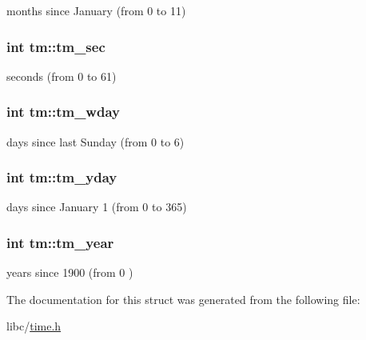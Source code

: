 months since January (from 0 to 11) \hypertarget{structtm_a4d098a9a5c03a00b2ee61e10851de81e}{
\subsubsection[{tm\_\-sec}]{\setlength{\rightskip}{0pt plus 5cm}int {\bf tm::tm\_\-sec}}}
\label{structtm_a4d098a9a5c03a00b2ee61e10851de81e}
seconds (from 0 to 61) \hypertarget{structtm_afe81a8c46f1c693c43f259b288859f4f}{
\subsubsection[{tm\_\-wday}]{\setlength{\rightskip}{0pt plus 5cm}int {\bf tm::tm\_\-wday}}}
\label{structtm_afe81a8c46f1c693c43f259b288859f4f}
days since last Sunday (from 0 to 6) \hypertarget{structtm_a93a0ba77cc23796df84405dcbcc57eb1}{
\subsubsection[{tm\_\-yday}]{\setlength{\rightskip}{0pt plus 5cm}int {\bf tm::tm\_\-yday}}}
\label{structtm_a93a0ba77cc23796df84405dcbcc57eb1}
days since January 1 (from 0 to 365) \hypertarget{structtm_a33adf78fd6476b2120ce3b9c4a852053}{
\subsubsection[{tm\_\-year}]{\setlength{\rightskip}{0pt plus 5cm}int {\bf tm::tm\_\-year}}}
\label{structtm_a33adf78fd6476b2120ce3b9c4a852053}
years since 1900 (from 0 ) 

The documentation for this struct was generated from the following file:\begin{DoxyCompactItemize}
\item 
libc/\hyperlink{time_8h}{time.h}\end{DoxyCompactItemize}
